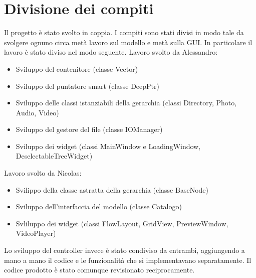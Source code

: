 \section{Divisione dei compiti}

Il progetto è stato svolto in coppia. I compiti sono stati divisi in modo tale da svolgere ognuno circa metà lavoro sul modello e metà sulla GUI.
In particolare il lavoro è stato diviso nel modo seguente. \newline
Lavoro svolto da Alessandro:
\begin{itemize}
    \item Sviluppo del contenitore (classe Vector)
    \item Sviluppo del puntatore smart (classe DeepPtr)
    \item Sviluppo delle classi istanziabili della gerarchia (classi Directory, Photo, Audio, Video)
    \item Sviluppo del gestore del file (classe IOManager)
    \item Sviluppo dei widget (classi MainWindow e LoadingWindow, DeselectableTreeWidget)
\end{itemize}
Lavoro svolto da Nicolas:
\begin{itemize}
    \item Svilippo della classe astratta della gerarchia (classe BaseNode)
    \item Sviluppo dell'interfaccia del modello (classe Catalogo)
    \item Svliluppo dei widget (classi FlowLayout, GridView, PreviewWindow, VideoPlayer)
\end{itemize}
Lo sviluppo del controller invece è stato condiviso da entrambi, aggiungendo a mano a mano il codice e le funzionalità che si implementavano separatamente.
Il codice prodotto è stato comunque revisionato reciprocamente. 